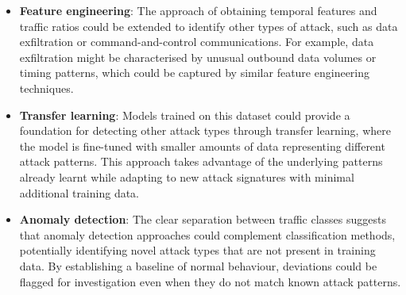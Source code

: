 \begin{itemize}
    \item \textbf{Feature engineering}: The approach of obtaining temporal features and traffic ratios could be extended to identify other types of attack, such as data exfiltration or command-and-control communications. For example, data exfiltration might be characterised by unusual outbound data volumes or timing patterns, which could be captured by similar feature engineering techniques.
    
    \item \textbf{Transfer learning}: Models trained on this dataset could provide a foundation for detecting other attack types through transfer learning, where the model is fine-tuned with smaller amounts of data representing different attack patterns. This approach takes advantage of the underlying patterns already learnt while adapting to new attack signatures with minimal additional training data.
    
    \item \textbf{Anomaly detection}: The clear separation between traffic classes suggests that anomaly detection approaches could complement classification methods, potentially identifying novel attack types that are not present in training data. By establishing a baseline of normal behaviour, deviations could be flagged for investigation even when they do not match known attack patterns.
\end{itemize}

